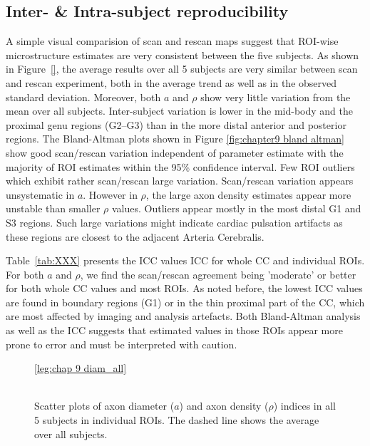 \subsection*{Inter- \& Intra-subject reproducibility}
A simple visual comparision of scan and rescan maps suggest that ROI-wise microstructure estimates are very consistent between the five subjects. As shown in Figure~\ref{}, the average results over all 5 subjects are very similar between scan and rescan experiment, both in the average trend as well as in the observed standard deviation. Moreover, both $a$ and $\rho$ show very little variation from the mean over all subjects. Inter-subject variation is lower in the mid-body and the proximal genu regions (G2--G3) than in the more distal anterior and posterior regions. The Bland-Altman plots shown in Figure \ref{fig:chapter9 bland altman} show good scan/rescan variation independent of parameter estimate with the majority of ROI estimates within the 95\% confidence interval. Few ROI outliers which exhibit rather scan/rescan large variation. Scan/rescan variation appears unsystematic in $a$. However in $\rho$, the large axon density estimates appear more unstable than smaller $\rho$ values. Outliers appear mostly in the most distal G1 and S3 regions. Such large variations might indicate cardiac pulsation artifacts as these regions are closest to the adjacent Arteria Cerebralis. 


Table~\ref{tab:XXX} presents the ICC values \gls{ICC} for whole CC and individual ROIs. For both $a$ and $\rho$, we find the scan/rescan agreement being 'moderate' or better for both whole CC values and most ROIs. As noted before, the lowest ICC values are found in boundary regions (G1) or in the thin proximal part of the CC, which are most affected by imaging and analysis artefacts. Both Bland-Altman analysis as well as the ICC suggests that estimated values in those ROIs appear more prone to error and must be interpreted with caution.

\begin{figure}[ht]
	\centering
	\ref{leg:chap 9 diam_all}
	\\	
	\\
	\caption{Scatter plots of axon diameter ($a$) and axon density ($\rho$) indices in all 5 subjects in individual ROIs. The dashed line shows the average over all subjects.}
	\label{fig:chap9 scan rescan scatterplots per subject}
\end{figure}

